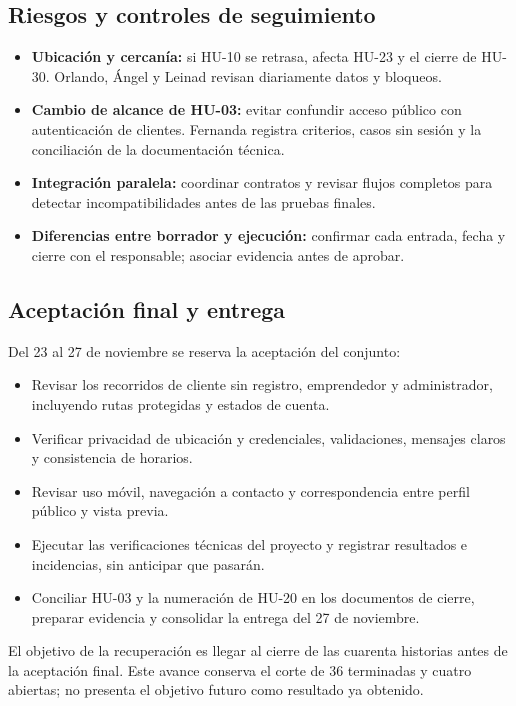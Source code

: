 \subsection{Riesgos y controles de seguimiento}
\begin{itemize}
\item \textbf{Ubicación y cercanía:} si HU-10 se retrasa, afecta HU-23 y el
cierre de HU-30. Orlando, Ángel y Leinad revisan diariamente datos y bloqueos.
\item \textbf{Cambio de alcance de HU-03:} evitar confundir acceso público con
autenticación de clientes. Fernanda registra criterios, casos sin sesión y
la conciliación de la documentación técnica.
\item \textbf{Integración paralela:} coordinar contratos y revisar flujos
completos para detectar incompatibilidades antes de las pruebas finales.
\item \textbf{Diferencias entre borrador y ejecución:} confirmar cada entrada,
fecha y cierre con el responsable; asociar evidencia antes de aprobar.
\end{itemize}

\subsection{Aceptación final y entrega}
Del 23 al 27 de noviembre se reserva la aceptación del conjunto:
\begin{itemize}
\item Revisar los recorridos de cliente sin registro, emprendedor y
administrador, incluyendo rutas protegidas y estados de cuenta.
\item Verificar privacidad de ubicación y credenciales, validaciones,
mensajes claros y consistencia de horarios.
\item Revisar uso móvil, navegación a contacto y correspondencia entre
perfil público y vista previa.
\item Ejecutar las verificaciones técnicas del proyecto y registrar
resultados e incidencias, sin anticipar que pasarán.
\item Conciliar HU-03 y la numeración de HU-20 en los documentos de cierre,
preparar evidencia y consolidar la entrega del 27 de noviembre.
\end{itemize}

El objetivo de la recuperación es llegar al cierre de las cuarenta historias
antes de la aceptación final. Este avance conserva el corte de 36 terminadas
y cuatro abiertas; no presenta el objetivo futuro como resultado ya obtenido.

